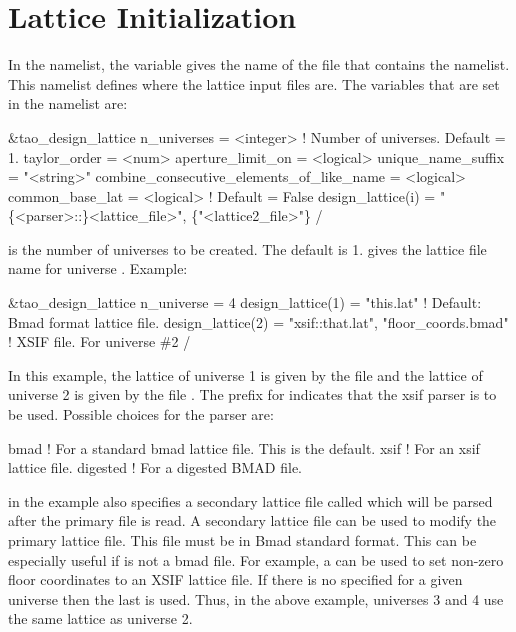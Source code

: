 {{%
\section{Lattice Initialization}
\label{s:init.lat} 

In the  namelist, the  variable gives
the name of the file that contains the 
namelist. This namelist defines where the lattice input files are. The
variables that are set in the  namelist are:
\begin{example}
  &tao_design_lattice
    n_universes        = <integer>      ! Number of universes. Default = 1.
    taylor_order       = <num>
    aperture_limit_on  = <logical>
    unique_name_suffix = "<string>"
    combine_consecutive_elements_of_like_name = <logical>
    common_base_lat = <logical>        ! Default = False
    design_lattice(i) = "\{<parser>::\}<lattice_file>", \{"<lattice2_file>"\}
  /
\end{example}

 is the number of universes to be created. The default is 1.
 gives the lattice file name for universe .
Example:
\begin{example}
  &tao_design_lattice
    n_universe = 4
    design_lattice(1) = "this.lat"      ! Default: Bmad format lattice file.
    design_lattice(2) = "xsif::that.lat", "floor_coords.bmad"
                                        ! XSIF file. For universe \#2 
  /
\end{example}
In this example, the lattice of universe 1 is given by the file
 and the lattice of universe 2 is given by the file
. The  prefix for 
indicates that the xsif parser is to be used. Possible
choices for the parser are:
\begin{example}
  bmad      ! For a standard bmad lattice file. This is the default.
  xsif      ! For an xsif lattice file.
  digested  ! For a digested BMAD file.
\end{example}
 in the example also specifies a secondary
lattice file called  which will be parsed after
the primary  file is read. A secondary lattice file can
be used to modify the primary lattice file. This file must be in Bmad
standard format. This can be especially useful if  is
not a bmad file. For example, a  can be used to set
non-zero floor coordinates to an XSIF lattice file. If there is no
 specified for a given universe then the last
 is used. Thus, in the above example, universes 3
and 4 use the same lattice as universe 2.

}}
